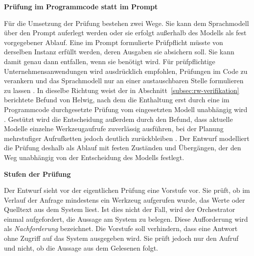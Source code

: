 \textbf{Prüfung im Programmcode statt im Prompt}

Für die Umsetzung der Prüfung bestehen zwei Wege. Sie kann dem Sprachmodell über den Prompt auferlegt werden oder sie erfolgt außerhalb des Modells als fest vorgegebener Ablauf. Eine im Prompt formulierte Prüfpflicht müsste von derselben Instanz erfüllt werden, deren Ausgaben sie absichern soll. Sie kann damit genau dann entfallen, wenn sie benötigt wird. Für prüfpflichtige Unternehmensanwendungen wird ausdrücklich empfohlen, Prüfungen im Code zu verankern und das Sprachmodell nur an einer austauschbaren Stelle formulieren zu lassen \cite{ahn_prompts_2026}. In dieselbe Richtung weist der in Abschnitt~\ref{subsec:rw-verifikation} berichtete Befund von Helwig, nach dem die Enthaltung erst durch eine im Programmcode durchgesetzte Prüfung vom eingesetzten Modell unabhängig wird \cite{helwig_metadata_2026}.
Gestützt wird die Entscheidung außerdem durch den Befund, dass aktuelle Modelle einzelne Werkzeugaufrufe zuverlässig ausführen, bei der Planung mehrstufiger Aufrufketten jedoch deutlich zurückbleiben \cite{wang_mcp-bench_2025}. Der Entwurf modelliert die Prüfung deshalb als Ablauf mit festen Zuständen und Übergängen, der den Weg unabhängig von der Entscheidung des Modells festlegt.

\textbf{Stufen der Prüfung}

Der Entwurf sieht vor der eigentlichen Prüfung eine Vorstufe vor. Sie prüft, ob im Verlauf der Anfrage mindestens ein Werkzeug aufgerufen wurde, das Werte oder Quelltext aus dem System liest. Ist dies nicht der Fall, wird der Orchestrator einmal aufgefordert, die Aussage am System zu belegen. Diese Aufforderung wird als \emph{Nachforderung} bezeichnet. Die Vorstufe soll verhindern, dass eine Antwort ohne Zugriff auf das System ausgegeben wird. Sie prüft jedoch nur den Aufruf und nicht, ob die Aussage aus dem Gelesenen folgt.

